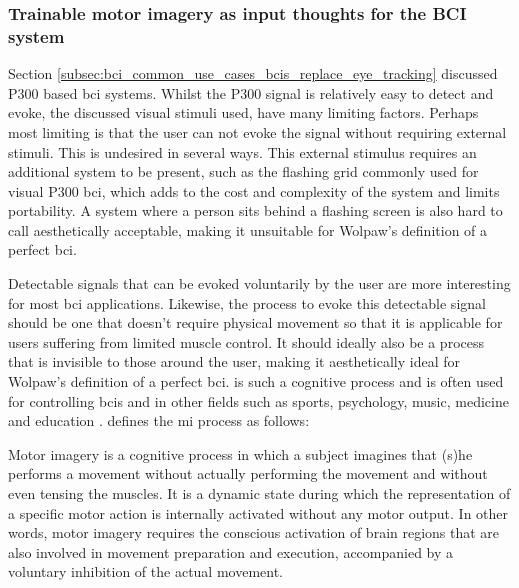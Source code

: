 
\subsubsection{Trainable motor imagery as input thoughts for the BCI system}
\label{subsubsec:bci_opportunities_obstacles_motivating_mi_tasks}

Section \ref{subsec:bci_common_use_cases_bcis_replace_eye_tracking} discussed P300 based \gls{bci} systems.
Whilst the P300 signal is relatively easy to detect and evoke, the discussed visual stimuli used, have many limiting factors.
Perhaps most limiting is that the user can not evoke the signal without requiring external stimuli.
This is undesired in several ways.
This external stimulus requires an additional system to be present, such as the flashing grid commonly used for visual P300 \gls{bci}, which adds to the cost and complexity of the system and limits portability.
A system where a person sits behind a flashing screen is also hard to call aesthetically acceptable, making it unsuitable for Wolpaw's definition of a perfect \gls{bci}.

Detectable signals that can be evoked voluntarily by the user are more interesting for most \gls{bci} applications.
Likewise, the process to evoke this detectable signal should be one that doesn't require physical movement so that it is applicable for users suffering from limited muscle control.
It should ideally also be a process that is invisible to those around the user, making it aesthetically ideal for Wolpaw's definition of a perfect \gls{bci}.
 is such a cognitive process and is often used for controlling \glspl{bci} and in other fields such as sports, psychology, music, medicine and education \citep{mi_uses}.
 defines the \gls{mi} process as follows:


\setlength{\epigraphwidth}{0.9\textwidth}
\epigraph{Motor imagery is a cognitive process in which a subject imagines that (s)he performs a movement without actually performing the movement and without even tensing the muscles. It is a dynamic state during which the representation of a specific motor action is internally activated without any motor output. In other words, motor imagery requires the conscious activation of brain regions that are also involved in movement preparation and execution, accompanied by a voluntary inhibition of the actual movement.}{\textit{\citet{mi_definition}}}

